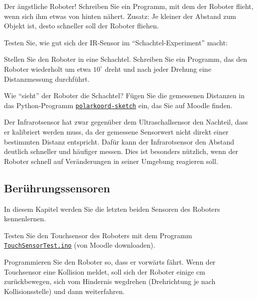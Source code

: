 \begin{myexercise}
    Der ängstliche Roboter!\newline
    Schreiben Sie ein Programm, mit dem der Roboter flieht, wenn sich ihm etwas von hinten nähert. \newline
    Zusatz: Je kleiner der Abstand zum Objekt ist, desto schneller soll der Roboter fliehen.
\end{myexercise}

\begin{myexercise}
    Testen Sie, wie gut sich der IR-Sensor im \enquote{Schachtel-Experiment} macht:
    \begin{aenum}
        \item Stellen Sie den Roboter in eine Schachtel. Schreiben Sie ein Programm, das den Roboter wiederholt um etwa \(10^\circ\) dreht und nach jeder Drehung eine Distanzmessung durchführt.
        \item Wie \enquote{sieht} der Roboter die Schachtel? Fügen Sie die gemessenen Distanzen in das  Python-Programm \hyperref[lst:polarkoord-sketch]{\texttt{polarkoord-sketch}} ein, das Sie auf Moodle finden.
    \end{aenum}

\end{myexercise}

\begin{myremark}
    Der Infrarotsensor hat zwar gegenüber dem Ultraschallsensor den Nachteil, dass er kalibriert werden muss, da der gemessene Sensorwert nicht direkt einer bestimmten Distanz entspricht. Dafür kann der Infrarotsensor den Abstand deutlich schneller und häufiger messen. Dies ist besonders nützlich, wenn der Roboter schnell auf Veränderungen in seiner Umgebung reagieren soll.
\end{myremark}

\clearpage

\subsection{Berührungssensoren}
In diesem Kapitel werden Sie die letzten beiden Sensoren des Roboters kennenlernen.

\begin{myexercise}
    \begin{aenum}
        \item Testen Sie den Touchsensor des Roboters mit dem Programm \hyperref[lst:touchsensor-test]{\texttt{TouchSensorTest.ino}} (von Moodle downloaden).
        \item Programmieren Sie den Roboter so, dass er vorwärts fährt. Wenn der Touchsensor eine Kollision meldet, soll sich der Roboter einige cm zurückbewegen, sich vom Hindernis wegdrehen (Drehrichtung je nach Kollisionsstelle) und dann weiterfahren.
    \end{aenum}
\end{myexercise}
